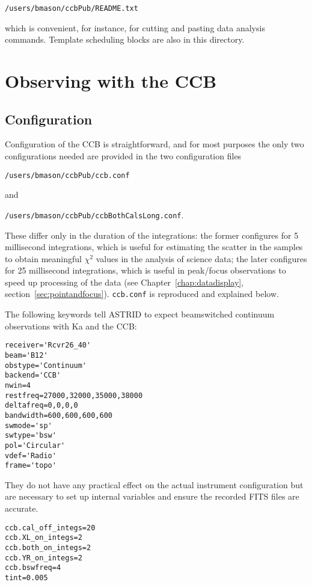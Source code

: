 \noindent
{\tt /users/bmason/ccbPub/README.txt}

\noindent
which is convenient, for instance, for cutting and pasting data analysis commands.
Template scheduling blocks are also in this directory.

\section{Observing with the CCB}

\subsection{Configuration}

Configuration of the CCB is straightforward, and for most
purposes the only two configurations needed are provided in the two
configuration files 

\noindent
{\tt /users/bmason/ccbPub/ccb.conf} 

\noindent
and 

\noindent
{\tt /users/bmason/ccbPub/ccbBothCalsLong.conf}. 

\noindent
These differ only in the duration of the integrations: the former
configures for 5 millisecond integrations, which is useful for
estimating the scatter in the samples to obtain meaningful $\chi^2$
values in the analysis of science data; the later configures for 25
millisecond integrations, which is useful in peak/focus observations
to speed up processing of the data (see Chapter~\ref{chap:datadisplay}, section~\ref{sec:pointandfocus}). 
{\tt ccb.conf} is reproduced and explained below.

The following keywords tell ASTRID to expect beamswitched continuum
observations with Ka and the CCB:

\begin{lstlisting}[language=PythonAstrid,frame=single,framerule=1pt]
receiver='Rcvr26_40'
beam='B12'
obstype='Continuum'
backend='CCB'
nwin=4
restfreq=27000,32000,35000,38000
deltafreq=0,0,0,0
bandwidth=600,600,600,600
swmode='sp'
swtype='bsw'
pol='Circular'
vdef='Radio'
frame='topo'
\end{lstlisting}

They do not have any practical effect on the actual instrument
configuration but are necessary to set up internal variables and
ensure the recorded FITS files are accurate.

\begin{lstlisting}[language=PythonAstrid,frame=single,framerule=1pt]
ccb.cal_off_integs=20
ccb.XL_on_integs=2
ccb.both_on_integs=2
ccb.YR_on_integs=2
ccb.bswfreq=4
tint=0.005
\end{lstlisting}


